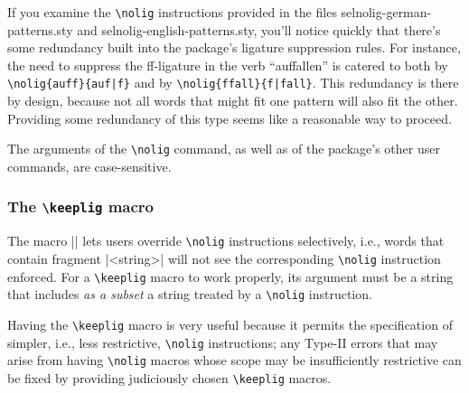 \documentclass[11pt]{article}
\newcommand{\pkg}[1]{\textsf{#1}}
\newcommand{\cmmd}[1]{\texttt{\textbackslash #1}}
\begin{document}
If you examine the \cmmd{nolig} instructions provided in the files \pkg{selnolig-german-patterns.sty} and \pkg{selnolig-english-patterns.sty}, you'll notice quickly that there's some redundancy built into the package's ligature suppression rules. For instance, the need to suppress the ff-ligature in the verb \enquote{auffallen} is catered to both by \Verb+\nolig{auff}{auf|f}+ and by \Verb+\nolig{ffall}{f|fall}+. This redundancy is there by design, because not all words that might fit one pattern will also fit the other. Providing some redundancy of this type seems like a reasonable way to proceed.

The arguments of the \cmmd{nolig} command, as well as of the package's other user commands, are case-sensitive. 

\subsubsection{The \cmmd{keeplig} macro} 
\label{sec:keeplig}


The macro || lets users override \cmmd{nolig} instructions selectively, i.e., words that contain fragment |<string>| will not see the corresponding \cmmd{nolig} instruction enforced. For a \cmmd{keeplig} macro to work properly, its argument must be a string that includes \emph{as a subset} a string treated by a \cmmd{nolig} instruction.

Having the \cmmd{keeplig} macro is very useful because it permits the specification of simpler, i.e., less restrictive, \cmmd{nolig} instructions; any Type-II errors that may arise from having \cmmd{nolig} macros whose scope may be insufficiently restrictive can be fixed by providing judiciously chosen \cmmd{keeplig} macros.
\end{document}
